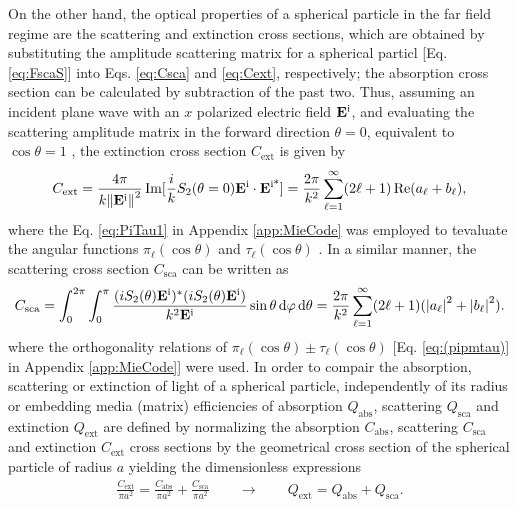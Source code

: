 






On the other hand, the optical properties of  a spherical particle in the far field regime are  the scattering and extinction cross sections, which are obtained by substituting the amplitude scattering matrix for a spherical particl [Eq. \eqref{eq:FscaS}]  into Eqs. \eqref{eq:Csca} and \eqref{eq:Cext}, respectively; the absorption cross section can be calculated by subtraction of the past two. Thus, assuming an incident plane wave with an $x$ polarized electric field $\vb{E}^\text{i}$, and evaluating the scattering amplitude matrix in the forward direction $\theta = 0$, equivalent to $\cos\theta = 1$ , the extinction cross section $C_\text{ext}$ is given by
\begin{align}
	C_\text{ext} = \frac{4\pi}{k \norm{\vb{E}^\text{i}}^2}\Im[\frac{i}{k}S_2(\theta = 0)\vb{E}^\text{i}\cdot\vb{E}^\text{i*}]
	  			 = \frac{2 \pi}{k^2}\sum_{\ell = 1}^\infty (2 \ell + 1) \Re(a_\ell + b_\ell),
	\label{eq:CextSphere}
\end{align}
where the Eq. \eqref{eq:PiTau1} in Appendix \ref{app:MieCode} was employed to tevaluate the angular functions $\pi_\ell(\cos\theta)$ and $\tau_\ell(\cos\theta)$ . In a similar manner, the scattering cross section $C_\text{sca}$  can be written as
%
\begin{align}
C_\text{sca} = \int_0^{2\pi}\int_0^\pi  \frac{(iS_2(\theta)\vb{E}^\text{i})^*(iS_2(\theta)\vb{E}^\text{i})}{k^2\vb{E}^\text{i}} \sin\theta\dd{\varphi}\dd{\theta}
			 = \frac{2 \pi}{k^2}\sum_{\ell = 1}^\infty (2 \ell + 1) (\abs{a_\ell}^2 + \abs{b_\ell}^2).
	\label{eq:CscaSphere}
\end{align}
%
where the orthogonality relations of $\pi_\ell(\cos\theta)\pm\tau_\ell(\cos\theta)$ [Eq. \eqref{eq:(pipmtau)} in Appendix \ref{app:MieCode}] were used. In order to compair the absorption, scattering or extinction of light of a spherical particle, independently of its radius or embedding media (matrix) efficiencies of  absorption $Q_\text{abs}$, scattering $Q_\text{sca}$ and extinction $Q_\text{ext}$ are defined by normalizing the   absorption $C_\text{abs}$, scattering $C_\text{sca}$ and extinction $C_\text{ext}$ cross sections by the geometrical cross section of the spherical particle of radius $a$ yielding the dimensionless expressions
%
\begin{align}
 	\frac{C_\text{ext}}{\pi a^2} =   \frac{C_\text{abs}}{\pi a^2}  + \frac{C_\text{sca}}{\pi a^2}
 		\qquad \longrightarrow \qquad
	Q_\text{ext} =    Q_\text{abs}  +  Q_\text{sca}.
	\label{eq:Efficiencies}
\end{align}
%

